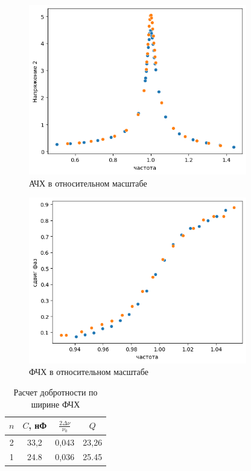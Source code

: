 \documentclass[a4paper, 12pt]{article}
\begin{document}
	\begin{figure}[H]
		\centering
		\includegraphics[width = 0.85\textwidth, height = 0.44\textheight]{images/image copy 2.png}
		\caption{АЧХ в относительном масштабе}
	\end{figure}
	
	\begin{figure}[H]
		\centering
		\includegraphics[width = 0.85\textwidth, height = 0.44\textheight]{images/image copy.png}
		\caption{ФЧХ в относительном масштабе}
	\end{figure}
	
	\begin{table}[h]
		\centering
		\begin{tabular}{|c|c|c|c|}
			\hline
			$n$ & $C$, нФ & $\frac{2\Delta \nu}{\nu_0}$ & $Q$ \\ \hline
			2 & 33,2 & 0,043 & 23,26 \\ \hline
			1 & 24.8 & 0,036 & 25.45 \\ \hline
		\end{tabular}
		\caption{Расчет добротности по ширине ФЧХ}
	\end{table}
	
\end{document}
